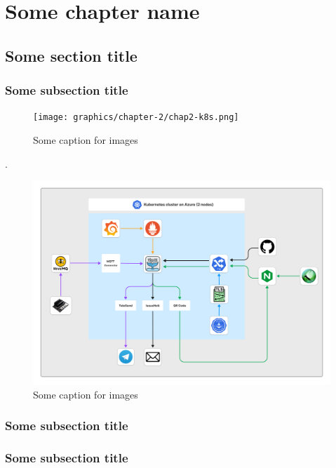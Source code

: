 \chapter{Some chapter name}

\section{Some section title}

\blindtext

\subsection{Some subsection title}
\blindtext
\blindtext
\begin{figure}
    \centering
    \texttt{[image: graphics/chapter-2/chap2-k8s.png]}
    \caption{Some caption for images}
    \label{fig:chap2-k8s}
\end{figure}
\blindtext
\blindtext \cite{vladimir2021cloudcomputing}.
\begin{figure}
    \centering
    \includegraphics[scale=0.5]{graphics/chapter-1/chap1-architecture.png}
    \caption{Some caption for images\cite{mcafee2020risk}}
    \label{fig:chap1-architecture}
\end{figure}
\subsection{Some subsection title}
\blindtext
\blindtext

\subsection{Some subsection title}
\blindtext
\blindtext \cite{mcafee2020risk}
\blindtext
\blindtext
\blindtext
